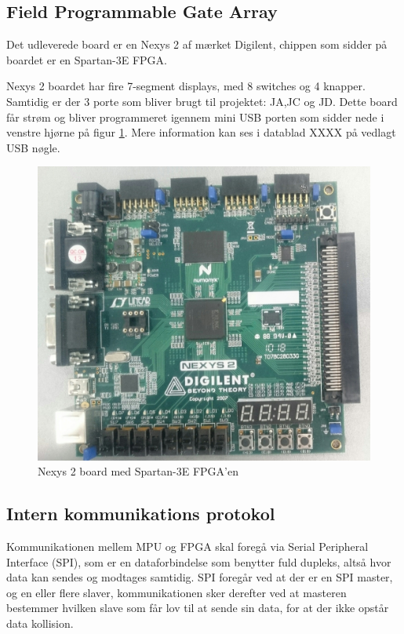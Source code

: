 \subsection{Field Programmable Gate Array}

Det udleverede board er en Nexys 2 af mærket Digilent, chippen som sidder på boardet er en Spartan-3E FPGA.

Nexys 2 boardet har fire 7-segment displays, med 8 switches og 4 knapper. Samtidig er der 3 porte som bliver brugt til projektet: JA,JC og JD.
Dette board får strøm og bliver programmeret igennem mini USB porten som sidder nede i venstre hjørne på figur \ref{fig:Nexys2Board}.
Mere information kan ses i datablad XXXX på vedlagt USB nøgle.

\begin{figure}[!ht]
	\begin{center}
		\includegraphics[scale=0.08, angle =0]{Billeder/Nexys2Board.JPG}
	\end{center}
\caption{Nexys 2 board med Spartan-3E FPGA'en}
\label{fig:Nexys2Board}
\end{figure}

\subsection{Intern kommunikations protokol}
Kommunikationen mellem MPU og FPGA skal foregå via Serial Peripheral Interface (SPI), som er en dataforbindelse som benytter fuld dupleks, altså hvor data kan sendes og modtages samtidig.
SPI foregår ved at der er en SPI master, og en eller flere slaver, kommunikationen sker derefter ved at masteren bestemmer hvilken slave som får lov til at sende sin data, for at der ikke opstår data kollision.

